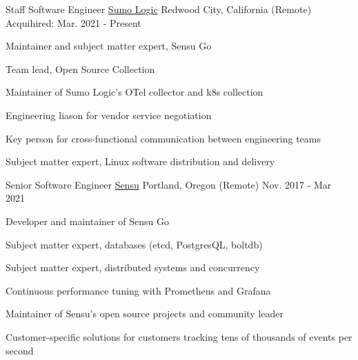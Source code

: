 

\begin{cventries}

  \cventry
    {Staff Software Engineer} %
	{\href{https://www.sumologic.com}{Sumo Logic}} %
	{Redwood City, California (Remote)} %
    {Acquihired: Mar. 2021 - Present} %
    {
      \begin{cvitems} %
        \item {Maintainer and subject matter expert, Sensu Go}
        \item {Team lead, Open Source Collection}
    	\item {Maintainer of Sumo Logic's OTel collector and k8s collection}
    	\item {Engineering liason for vendor service negotiation}
    	\item {Key person for cross-functional communication between engineering teams}
    	\item {Subject matter expert, Linux software distribution and delivery}
      \end{cvitems}
    }


  \cventry
	{Senior Software Engineer}
	{\href{https://sensu.io}{Sensu}}
	{Portland, Oregon (Remote)}
	{Nov. 2017 - Mar 2021}
	{
	  \begin{cvitems}
		\item {Developer and maintainer of Sensu Go}
		\item {Subject matter expert, databases (etcd, PostgresQL, boltdb)}
		\item {Subject matter expert, distributed systems and concurrency}
		\item {Continuous performance tuning with Prometheus and Grafana}
		\item {Maintainer of Sensu's open source projects and community leader}
		\item {Customer-specific solutions for customers tracking tens of thousands of events per second}
	  \end{cvitems}
	}



\end{cventries}
